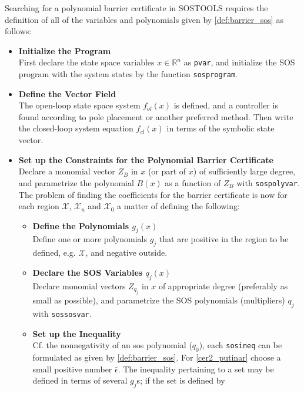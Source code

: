 Searching for a polynomial barrier certificate in SOSTOOLS requires the definition of all of the variables and polynomials given by \autoref{def:barrier_sos} as follows:
\vspace{-2mm}
\renewcommand{\labelitemii}{$\circ$}
\renewcommand{\labelitemiii}{$\bullet$}
\begin{itemize}
	\itemsep-0.7mm
	\item \textbf{Initialize the Program}\\
	First declare the state space variables $x\in\mathbb{R}^n$ as \texttt{pvar}, and initialize the SOS program with the system states by the function \texttt{sosprogram}.
	\item \textbf{Define the Vector Field}\\
	The open-loop state space system $f_{ol}(x)$ is defined, and a controller is found according to pole placement or another preferred method. Then write the closed-loop system equation $f_{cl}(x)$ in terms of the symbolic state vector.
	\item \textbf{Set up the Constraints for the Polynomial Barrier Certificate}\\
	Declare a monomial vector $Z_B$ in $x$ (or part of $x$) of sufficiently large degree, and parametrize the polynomial $B(x)$ as a function of $Z_B$ with \texttt{sospolyvar}.  
	The problem of finding the coefficients for the barrier certificate is now for each region $\mathcal{X}$, $\mathcal{X}_u$ and $\mathcal{X}_0$ a matter of defining the following:
	\vspace*{-1mm}
	\begin{itemize}
		\item \textbf{Define the Polynomials $g_j(x)$}\\
		Define one or more polynomials $g_j$ that are positive in the region to be defined, e.g. $\mathcal{X}$, and negative outside. %
		\item \textbf{Declare the SOS Variables $q_j(x)$}\\
		Declare monomial vectors $Z_{q_j}$ in $x$ of appropriate degree (preferably as small as possible), %
		and parametrize the SOS polynomials (multipliers) $q_j$ with \texttt{sossosvar}.
		\item \textbf{Set up the Inequality}\\
		Cf. the nonnegativity of an \gls{sos} polynomial ($q_0$), each \texttt{sosineq} can be formulated as given by  \autoref{def:barrier_sos}. For \autoref{cer2_putinar} choose a small positive number $\bar{\epsilon}$. The inequality pertaining to a set may be defined in terms of several $g_j$s; if the set is defined by

\end{itemize}
\end{itemize}
